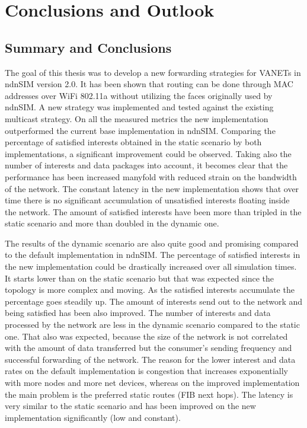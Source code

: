 \chapter{Conclusions and Outlook}


\section{Summary and Conclusions}

The goal of this thesis was to develop a new forwarding strategies for VANETs in ndnSIM version 2.0. It has been shown that routing can be done through MAC addresses over WiFi 802.11a without utilizing the faces originally used by ndnSIM. A new strategy was implemented and tested against the existing multicast strategy. On all the measured metrics the new implementation outperformed the current base implementation in ndnSIM.
Comparing the percentage of satisfied interests obtained in the static scenario by both implementations, a significant improvement could be observed. Taking also the number of interests and data packages into account, it becomes clear that the performance has been increased manyfold with reduced strain on the bandwidth of the network. The constant latency in the new implementation shows that over time there is no significant accumulation of unsatisfied interests floating inside the network. The amount of satisfied interests have been more than tripled in the static scenario and more than doubled in the dynamic one.

\vspace{5mm} %

The results of the dynamic scenario are also quite good and promising compared to the default implementation in ndnSIM. The percentage of satisfied interests in the new implementation could be drastically increased over all simulation times. It starts lower than on the static scenario but that was expected since the topology is more complex and moving. As the satisfied interests accumulate the percentage goes steadily up. The amount of interests send out to the network and being satisfied has been also improved. The number of interests and data processed by the network are less in the dynamic scenario compared to the static one. That also was expected, because the size of the network is not correlated with the amount of data transferred but the consumer's sending frequency and successful forwarding of the network. The reason for the lower interest and data rates on the default implementation is congestion that increases exponentially with more nodes and more net devices, whereas on the improved implementation the main problem is the preferred static routes (FIB next hops). The latency is very similar to the static scenario and has been improved on the new implementation significantly (low and constant).

